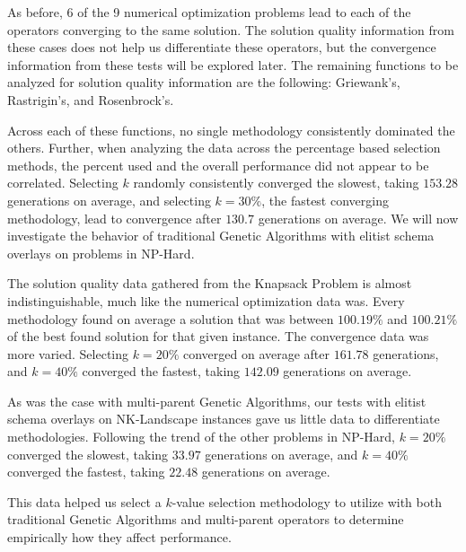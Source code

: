 As before, 6 of the 9 numerical optimization problems lead to each of the operators converging to the same solution. The solution quality information from these cases does not help us differentiate these operators, but the convergence information from these tests will be explored later. The remaining functions to be analyzed for solution quality information are the following: Griewank's, Rastrigin's, and Rosenbrock's.

%
%

Across each of these functions, no single methodology consistently dominated the others. Further, when analyzing the data across the percentage based selection methods, the percent used and the overall performance did not appear to be correlated. Selecting $k$ randomly consistently converged the slowest, taking $153.28$ generations on average, and selecting $k = 30\%$, the fastest converging methodology, lead to convergence after $130.7$ generations on average. We will now investigate the behavior of traditional Genetic Algorithms with elitist schema overlays on problems in NP-Hard.

%
%

The solution quality data gathered from the Knapsack Problem is almost indistinguishable, much like the numerical optimization data was. Every methodology found on average a solution that was between $100.19\%$ and $100.21\%$ of the best found solution for that given instance. The convergence data was more varied. Selecting $k = 20\%$ converged on average after $161.78$ generations, and $k = 40\%$ converged the fastest, taking $142.09$ generations on average. 

%
%

%
%

As was the case with multi-parent Genetic Algorithms, our tests with elitist schema overlays on NK-Landscape instances gave us little data to differentiate methodologies. Following the trend of the other problems in NP-Hard, $k = 20\%$ converged the slowest, taking $33.97$ generations on average, and $k = 40\%$ converged the fastest, taking $22.48$ generations on average.

This data helped us select a $k$-value selection methodology to utilize with both traditional Genetic Algorithms and multi-parent operators to determine empirically how they affect performance.

